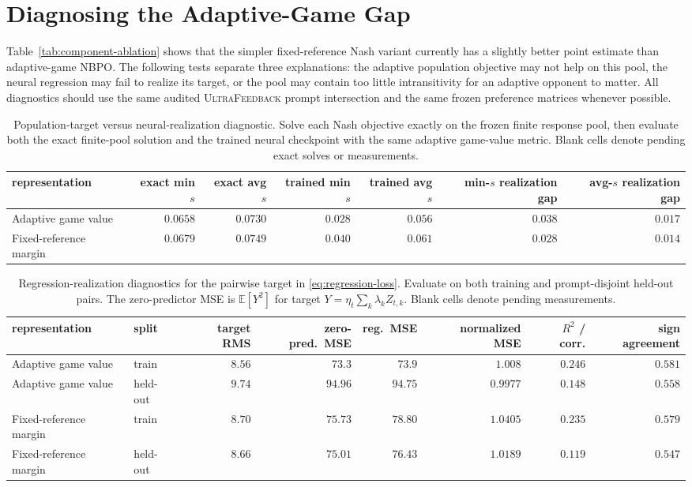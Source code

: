 \documentclass{article}
\theoremstyle{remark}
\theoremstyle{plain}
\newcommand{\E}{\mathbb{E}}
\newcommand{\NBPO}{\textsc{NBPO}}
\begin{document}
\section{Diagnosing the Adaptive-Game Gap}
\label{app:representation-diagnostics}
Table~\ref{tab:component-ablation} shows that the simpler fixed-reference Nash
variant currently has a slightly better point estimate than adaptive-game
\NBPO{}. The following tests separate three explanations: the adaptive
population objective may not help on this pool, the neural regression may fail
to realize its target, or the pool may contain too little intransitivity for an
adaptive opponent to matter. All diagnostics should use the same audited
\textsc{UltraFeedback} prompt intersection and the same frozen preference
matrices whenever possible.

\begin{table}[t]
\centering\scriptsize
\setlength{\tabcolsep}{3.0pt}
\caption{Population-target versus neural-realization diagnostic. Solve each Nash objective exactly on the frozen finite response pool, then evaluate both the exact finite-pool solution and the trained neural checkpoint with the same adaptive game-value metric. Blank cells denote pending exact solves or measurements.}
\label{tab:finite-pool-realization}
\begin{tabular}{lrrrrrr}
\toprule
representation & exact min $s$ & exact avg $s$ & trained min $s$ & trained avg $s$ & min-$s$ realization gap & avg-$s$ realization gap\\
\midrule
Adaptive game value & $0.0658$ & $0.0730$ & $0.028$ & $0.056$ & $0.038$ & $0.017$ \\
Fixed-reference margin & $0.0679$ & $0.0749$ & $0.040$ & $0.061$ & $0.028$ & $0.014$ \\
\bottomrule
\end{tabular}
\end{table}

\begin{table}[t]
\centering\scriptsize
\setlength{\tabcolsep}{2.4pt}
\caption{Regression-realization diagnostics for the pairwise target in \eqref{eq:regression-loss}. Evaluate on both training and prompt-disjoint held-out pairs. The zero-predictor MSE is $\E[Y^2]$ for target $Y=\eta_t\sum_k\lambda_k Z_{t,k}$. Blank cells denote pending measurements.}
\label{tab:regression-realization}
\begin{tabular}{llrrrrrr}
\toprule
representation & split & target RMS & zero-pred.\ MSE & reg.\ MSE & normalized MSE & $R^2$ / corr. & sign agreement\\
\midrule
Adaptive game value & train & $8.56$ & $73.3$ & $73.9$ & $1.008$ & $0.246$ & $0.581$ \\
Adaptive game value & held-out & $9.74$ & $94.96$ & $94.75$ & $0.9977$ & $0.148$ & $0.558$ \\
Fixed-reference margin & train & $8.70$ & $75.73$ & $78.80$ & $1.0405$ & $0.235$ & $0.579$ \\
Fixed-reference margin & held-out & $8.66$ & $75.01$ & $76.43$ & $1.0189$ & $0.119$ & $0.547$ \\
\bottomrule
\end{tabular}
\end{table}
\end{document}
